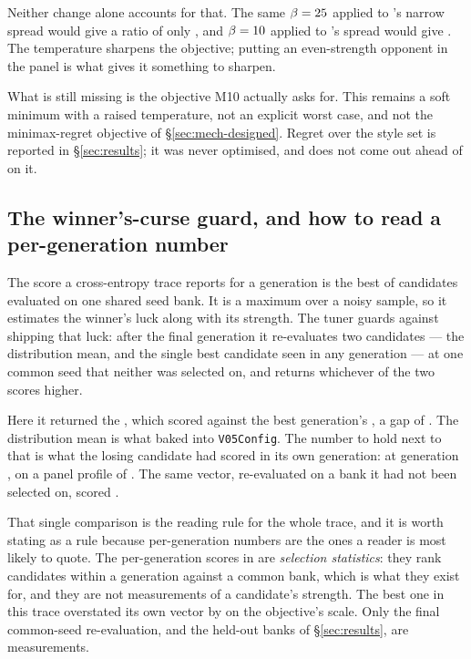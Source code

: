 Neither change alone accounts for that. The same $\beta = 25$ applied to
\vfour{}'s narrow spread would give a ratio of only \numFitRatioCross{}, and
$\beta = 10$ applied to \vfive{}'s spread would give
\numFitRatioAtTen{}. The temperature sharpens the objective; putting an
even-strength opponent in the panel is what gives it something to sharpen.

What is still missing is the objective M10 actually asks for. This remains a soft
minimum with a raised temperature, not an explicit worst case, and not the
minimax-regret objective of \S\ref{sec:mech-designed}. Regret over the style set
is reported in \S\ref{sec:results}; it was never optimised, and \vfive{} does not
come out ahead of \vfour{} on it.

\subsection{The winner's-curse guard, and how to read a per-generation number}
\label{sec:fit-guard}

The score a cross-entropy trace reports for a generation is the best of
\numFitPop{} candidates evaluated on one shared seed bank. It is a maximum over a
noisy sample, so it estimates the winner's luck along with its strength. The
tuner guards against shipping that luck: after the final generation it
re-evaluates two candidates --- the distribution mean, and the single best
candidate seen in any generation --- at one common seed that neither was selected
on, and returns whichever of the two scores higher.

Here it returned the \numFitGuardWinner{}, which scored \numFitGuardMu{} against
the best generation's \numFitGuardBest{}, a gap of \numFitGuardGap{}. The
distribution mean is what  baked into
\texttt{V05Config}. The number to hold next to that is what the losing candidate
had scored in its own generation: \numFitScore{} at generation
\numFitBestGen{}, on a panel profile of \numFitProfile{}. The same vector,
re-evaluated on a bank it had not been selected on, scored \numFitGuardBest{}.

That single comparison is the reading rule for the whole trace, and it is worth
stating as a rule because per-generation numbers are the ones a reader is most
likely to quote. The per-generation scores in
 are \emph{selection statistics}:
they rank candidates within a generation against a common bank, which is what
they exist for, and they are not measurements of a candidate's strength. The best
one in this trace overstated its own vector by \numFitCurse{} on the objective's
scale. Only the final common-seed re-evaluation, and the held-out banks of
\S\ref{sec:results}, are measurements.

